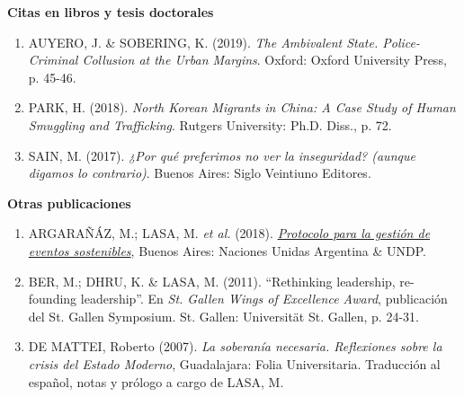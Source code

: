 \documentclass[12pt]{article}
\begin{document}
\begin{rSection}

{\bf Citas en libros y tesis doctorales}

\end{rSection}

\begin{enumerate}

\item  AUYERO, J. \& SOBERING, K. (2019). {\it The Ambivalent State. Police-Criminal Collusion at the Urban Margins}. Oxford: Oxford University Press, p. 45-46.

\item  PARK, H. (2018). {\it North Korean Migrants in China: A Case Study of Human Smuggling and Trafficking}. Rutgers University: Ph.D. Diss., p. 72.

\item  SAIN, M. (2017). {\it ¿Por qué preferimos no ver la inseguridad? (aunque digamos lo contrario)}. Buenos Aires: Siglo Veintiuno Editores.

\end{enumerate}

\begin{rSection}

{\bf Otras publicaciones}

\end{rSection}

\begin{enumerate}

\item ARGARAÑÁZ, M.; LASA, M. {\it et al.} (2018). \href{https://www.ar.undp.org/content/argentina/es/home/library/environment_energy/PortocoloES.html}{\it Protocolo para la gestión de eventos sostenibles}, Buenos Aires: Naciones Unidas Argentina \& UNDP.

\item BER, M.; DHRU, K. \& LASA, M. (2011). “Rethinking leadership, re-founding leadership”. En {\it St. Gallen Wings of Excellence Award}, publicación del St. Gallen Symposium. St. Gallen: Universität St. Gallen, p. 24-31.

\item DE MATTEI, Roberto (2007). {\it La soberanía necesaria. Reflexiones sobre la crisis del Estado Moderno}, Guadalajara: Folia Universitaria. Traducción al español, notas y prólogo a cargo de LASA, M.\\ \\

\end{enumerate}
\end{document}
